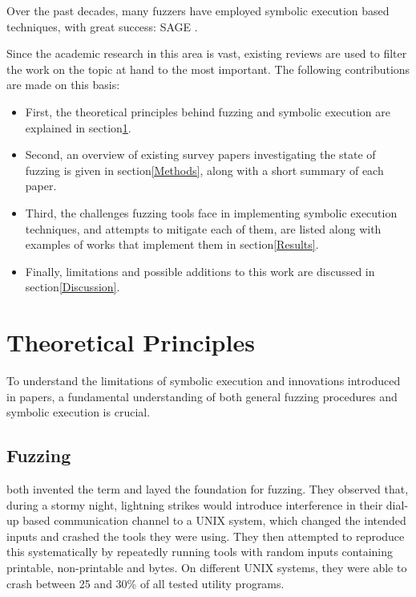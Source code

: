 \documentclass{article}
\begin{document}
\begin{multicols}{2}
    Over the past decades, many fuzzers\cite{BitBlaze,CORAL,CREST,CUTE,CVC5,CVCLite,Chopped,Cyberdyne,DART,DTSA,DiSE,DigFuzz,Dowser,Driller,EGT,EXE,Fitnex,FloPSy,GRT,GSE,HCT,HFL,IFL,Intriguer,JFI,KATCH,KLEE,KLEEFP,LATEST,MoWF,Moles,PYGMALION,Pangolin,Pex,QSYM,QuickFuzz,RWset,SAGE,SAVIOR,SMART,SPIN,STP,ScalableAutomatedMethods,TFuzz,TaintScope,VUzzer} have employed symbolic execution based techniques, with great success: SAGE\cite{SAGE} \cite{FuzzingTheStateOfTheArt}.

    Since the academic research in this area is vast, existing reviews are used to filter the work on the topic at hand to the most important. The following contributions are made on this basis:
    \begin{itemize}
        \item First, the theoretical principles behind fuzzing and symbolic execution are explained in section\ref{Theory}.
        \item Second, an overview of existing survey papers investigating the state of fuzzing is given in section\ref{Methods}, along with a short summary of each paper.
        \item Third, the challenges fuzzing tools face in implementing symbolic execution techniques, and attempts to mitigate each of them, are listed along with examples of works that implement them in section\ref{Results}.
        \item Finally, limitations and possible additions to this work are discussed in section\ref{Discussion}.
    \end{itemize}

    \section{Theoretical Principles}
    \label{Theory}

    To understand the limitations of symbolic execution and innovations introduced in papers, a fundamental understanding of both general fuzzing procedures and symbolic execution is crucial.

    \subsection{Fuzzing}

    \citeauthor{UNIX} both invented the term and layed the foundation for fuzzing. They observed that, during a stormy night, lightning strikes would introduce interference in their dial-up based communication channel to a UNIX system, which changed the intended inputs and crashed the tools they were using. They then attempted to reproduce this systematically by repeatedly running tools with random inputs containing printable, non-printable and  bytes. On different UNIX systems, they were able to crash between 25 and 30\% of all tested utility programs.\cite{UNIX}


\end{multicols}
\end{document}
